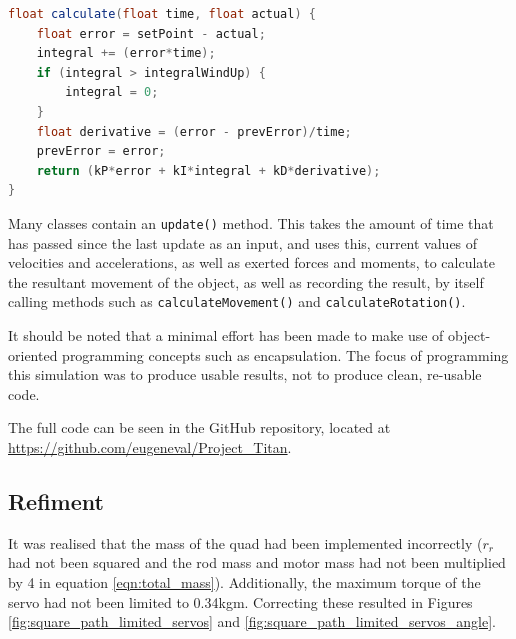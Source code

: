 \documentclass[11pt]{article}
\begin{document}
\begin{lstlisting}[language=Java]
float calculate(float time, float actual) {
    float error = setPoint - actual;
    integral += (error*time);
    if (integral > integralWindUp) {
        integral = 0;
    }
    float derivative = (error - prevError)/time;
    prevError = error;
    return (kP*error + kI*integral + kD*derivative);
}
\end{lstlisting}

Many classes contain an \lstinline|update()| method. This takes the amount of time that has passed since the last update as an input, and uses this, current values of velocities and accelerations, as well as exerted forces and moments, to calculate the resultant movement of the object, as well as recording the result, by itself calling methods such as \lstinline|calculateMovement()| and \lstinline|calculateRotation()|.

It should be noted that a minimal effort has been made to make use of object-oriented programming concepts such as encapsulation. The focus of programming this simulation was to produce usable results, not to produce clean, re-usable code.

The full code can be seen in the GitHub repository, located at \url{https://github.com/eugeneval/Project_Titan}.


\subsection{Refiment}
It was realised that the mass of the quad had been implemented incorrectly ($r_r$ had not been squared and the rod mass and motor mass had not been multiplied by 4 in equation \ref{eqn:total_mass}). Additionally, the maximum torque of the servo had not been limited to 0.34kgm. Correcting these resulted in Figures \ref{fig:square_path_limited_servos} and \ref{fig:square_path_limited_servos_angle}.
\end{document}
